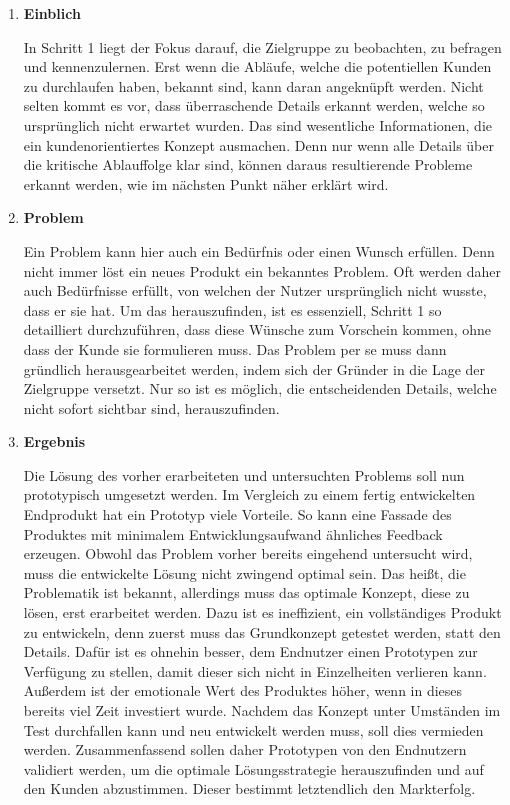 \begin{enumerate}
	\item \textbf{Einblich}
	
	In Schritt 1 liegt der Fokus darauf, die Zielgruppe zu beobachten, zu befragen und kennenzulernen. Erst wenn die Abläufe, welche die potentiellen Kunden zu durchlaufen haben, bekannt sind, kann daran angeknüpft werden. Nicht selten kommt es vor, dass überraschende Details erkannt werden, welche so ursprünglich nicht erwartet wurden. Das sind wesentliche Informationen, die ein kundenorientiertes Konzept ausmachen. Denn nur wenn alle Details über die kritische Ablauffolge klar sind, können daraus resultierende Probleme erkannt werden, wie im nächsten Punkt näher erklärt wird. 
	
	\item \textbf{Problem}
	
	Ein Problem kann hier auch ein Bedürfnis oder einen Wunsch erfüllen. Denn nicht immer löst ein neues Produkt ein bekanntes Problem. Oft werden daher auch Bedürfnisse erfüllt, von welchen der Nutzer ursprünglich nicht wusste, dass er sie hat. Um das herauszufinden, ist es essenziell, Schritt 1 so detailliert durchzuführen, dass diese Wünsche zum Vorschein kommen, ohne dass der Kunde sie formulieren muss. Das Problem per se muss dann gründlich herausgearbeitet werden, indem sich der Gründer in die Lage der Zielgruppe versetzt. Nur so ist es möglich, die entscheidenden Details, welche nicht sofort sichtbar sind, herauszufinden.
	
	\item \textbf{Ergebnis}
	
	Die Lösung des vorher erarbeiteten und untersuchten Problems soll nun prototypisch umgesetzt werden. Im Vergleich zu einem fertig entwickelten Endprodukt hat ein Prototyp viele Vorteile. So kann eine Fassade des Produktes mit minimalem Entwicklungsaufwand ähnliches Feedback erzeugen. Obwohl das Problem vorher bereits eingehend untersucht wird, muss die entwickelte Lösung nicht zwingend optimal sein. Das heißt, die Problematik ist bekannt, allerdings muss das optimale Konzept, diese zu lösen, erst erarbeitet werden. Dazu ist es ineffizient, ein vollständiges Produkt zu entwickeln, denn zuerst muss das Grundkonzept getestet werden, statt den Details. Dafür ist es ohnehin besser, dem Endnutzer einen Prototypen zur Verfügung zu stellen, damit dieser sich nicht in Einzelheiten verlieren kann. Außerdem ist der emotionale Wert des Produktes höher, wenn in dieses bereits viel Zeit investiert wurde. Nachdem das Konzept unter Umständen im Test durchfallen kann und neu entwickelt werden muss, soll dies vermieden werden. Zusammenfassend sollen daher Prototypen von den Endnutzern validiert werden, um die optimale Lösungsstrategie herauszufinden und auf den Kunden abzustimmen. Dieser bestimmt letztendlich den Markterfolg.
	

\end{enumerate}

